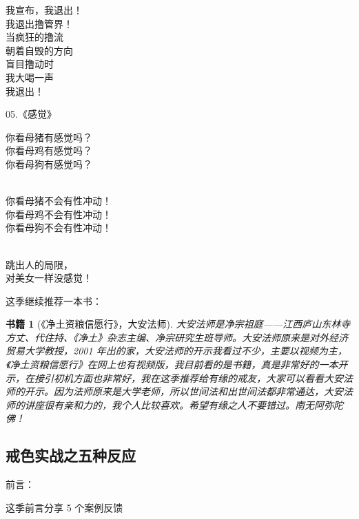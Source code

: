 \documentclass{ctexart}
\newtheorem{book}{书籍}
\begin{document}
\begin{multicols}{2}
\begin{center}
        我宣布，我退出！ \\ 我退出撸管界！ \\ 当疯狂的撸流 \\ 朝着自毁的方向 \\ 盲目撸动时 \\ 我大喝一声 \\ 我退出！
    \end{center}

    \begin{center}
        05.《感觉》\it

        你看母猪有感觉吗？ \\ 你看母鸡有感觉吗？ \\ 你看母狗有感觉吗？

        ~\\

        你看母猪不会有性冲动！ \\ 你看母鸡不会有性冲动！ \\ 你看母狗不会有性冲动！

        ~\\

        跳出人的局限， \\ 对美女一样没感觉！
    \end{center}
\end{multicols}

这季继续推荐一本书：

\begin{book}[《净土资粮信愿行》，大安法师]
    大安法师是净宗祖庭——江西庐山东林寺方丈、代住持、《净土》杂志主编、净宗研究生班导师。大安法师原来是对外经济贸易大学教授，2001 年出的家，大安法师的开示我看过不少，主要以视频为主，《净土资粮信愿行》在网上也有视频版，我目前看的是书籍，真是非常好的一本开示，在接引初机方面也非常好，我在这季推荐给有缘的戒友，大家可以看看大安法师的开示。因为法师原来是大学老师，所以世间法和出世间法都非常通达，大安法师的讲座很有亲和力的，我个人比较喜欢。希望有缘之人不要错过。南无阿弥陀佛！
\end{book}

\subsection{戒色实战之五种反应}

前言：

这季前言分享 5 个案例反馈
\end{document}
